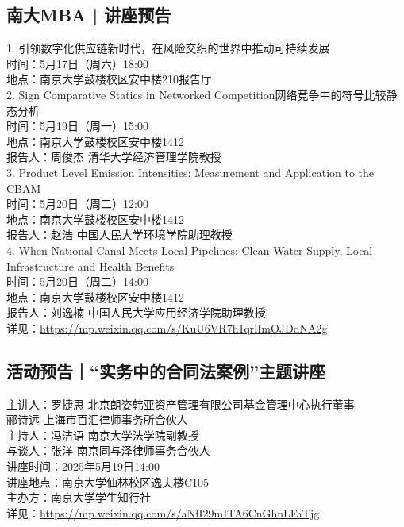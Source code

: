 \documentclass[letterpaper, 12pt]{article}
\begin{document}
\begin{multicols}{2}
\begin{tabular}{|>{\centering\arraybackslash}m{}|m{}|m{}|}
    \end{tabular}
    
\subsection{南大MBA | 讲座预告} %
1. 引领数字化供应链新时代，在风险交织的世界中推动可持续发展
\\时间：5月17日（周六）18:00
\\地点：南京大学鼓楼校区安中楼210报告厅
\\2. Sign Comparative Statics in Networked Competition网络竞争中的符号比较静态分析
\\时间：5月19日（周一）15:00
\\地点：南京大学鼓楼校区安中楼1412
\\报告人：周俊杰 清华大学经济管理学院教授
\\3. Product  Level Emission Intensities: Measurement and Application to the CBAM
\\时间：5月20日（周二）12:00
\\地点：南京大学鼓楼校区安中楼1412
\\报告人：赵浩 中国人民大学环境学院助理教授
\\4. When  National Canal Meets Local Pipelines: Clean Water Supply, Local Infrastructure  and Health Benefits
\\时间：5月20日（周二）14:00
\\地点：南京大学鼓楼校区安中楼1412
\\报告人：刘逸楠 中国人民大学应用经济学院助理教授
\\详见：\url{https://mp.weixin.qq.com/s/KuU6VR7h1qrlImOJDdNA2g}


\subsection{活动预告｜“实务中的合同法案例”主题讲座} %
主讲人：罗捷思 北京朗姿韩亚资产管理有限公司基金管理中心执行董事
\\郦诗远 上海市百汇律师事务所合伙人
\\主持人：冯洁语 南京大学法学院副教授
\\与谈人：张洋 南京同与泽律师事务合伙人
\\讲座时间：2025年5月19日14:00
\\讲座地点：南京大学仙林校区逸夫楼C105
\\主办方：南京大学学生知行社
\\详见：\url{https://mp.weixin.qq.com/s/aNfI29mITA6CnGhnLFaTjg}


\end{multicols}
\end{document}
